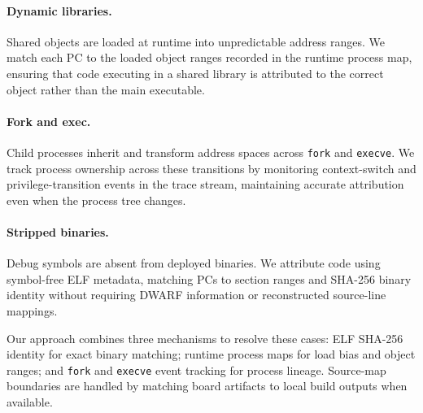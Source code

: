 \paragraph{Dynamic libraries.}
Shared objects are loaded at runtime into unpredictable address ranges.
We match each PC to the loaded object ranges recorded in the runtime
process map, ensuring that code executing in a shared library is
attributed to the correct object rather than the main executable.

\paragraph{Fork and exec.}
Child processes inherit and transform address spaces across \texttt{fork}
and \texttt{execve}.
We track process ownership across these transitions by monitoring
context-switch and privilege-transition events in the trace stream,
maintaining accurate attribution even when the process tree changes.

\paragraph{Stripped binaries.}
Debug symbols are absent from deployed binaries.
We attribute code using symbol-free ELF metadata, matching PCs to section
ranges and SHA-256 binary identity without requiring DWARF information or
reconstructed source-line mappings.

Our approach combines three mechanisms to resolve these cases: ELF
SHA-256 identity for exact binary matching; runtime process maps for
load bias and object ranges; and \texttt{fork} and \texttt{execve} event
tracking for process lineage.
Source-map boundaries are handled by matching board artifacts to local
build outputs when available.
